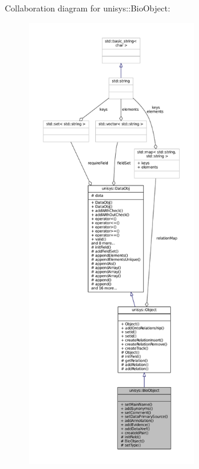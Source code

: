 Collaboration diagram for unisys\-:\-:Bio\-Object\-:
\nopagebreak
\begin{figure}[H]
\begin{center}
\leavevmode
\includegraphics[height=550pt]{classunisys_1_1BioObject__coll__graph}
\end{center}
\end{figure}
